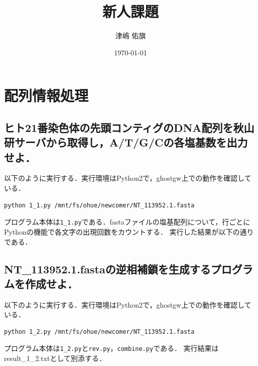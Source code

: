 \documentclass[uplatex,a4j]{jsarticle}
\title{新人課題}
\author{津嶋 佑旗}
\date{\today}
\begin{document}
  \maketitle
  \section{配列情報処理}
  \subsection{ヒト21番染色体の先頭コンティグのDNA配列を秋山研サーバから取得し，A/T/G/Cの各塩基数を出力せよ．}
  以下のように実行する．実行環境はPython2で，ghostgw上での動作を確認している．
  \begin{lstlisting}[caption=実行方法, label=run1]
    python 1_1.py /mnt/fs/ohue/newcomer/NT_113952.1.fasta
  \end{lstlisting}
  プログラム本体は{\tt 1\_1.py}である．fastaファイルの塩基配列について，行ごとにPythonの機能で各文字の出現回数をカウントする．
  実行した結果が以下の通りである．
  
  
  \subsection{NT\_113952.1.fastaの逆相補鎖を生成するプログラムを作成せよ．}
  以下のように実行する．実行環境はPython2で，ghostgw上での動作を確認している．
  \begin{lstlisting}[caption=実行方法, label=run2]
    python 1_2.py /mnt/fs/ohue/newcomer/NT_113952.1.fasta
  \end{lstlisting}
  プログラム本体は{\tt 1\_2.py}と{\tt rev.py}，{\tt combine.py}である．
  実行結果はresult\_1\_2.txtとして別添する．
  
\end{document}
